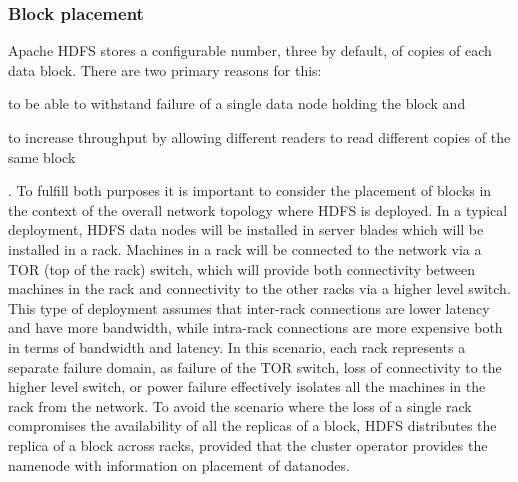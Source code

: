 \subsubsection{Block placement}
\label{sec:block-placement}
Apache HDFS stores a configurable number, three by default, of copies of each data block.
There are two primary reasons for this:
\begin{inparaenum}[i)]
\item to be able to withstand failure of a single data node holding the block and
\item to increase throughput by allowing different readers to read different copies of the same block
\end{inparaenum}.
To fulfill both purposes it is important to consider the placement of blocks in the context of the overall network topology where HDFS is deployed.
In a typical deployment, HDFS data nodes will be installed in server blades which will be installed in a rack.
Machines in a rack will be connected to the network via a TOR (top of the rack) switch, which will provide both connectivity between machines in the rack and connectivity to the other racks via a higher level switch.
This type of deployment assumes that inter-rack connections are lower latency and have more bandwidth, while intra-rack connections are more expensive both in terms of bandwidth and latency.
In this scenario, each rack represents a separate failure domain, as failure of the TOR switch, loss of connectivity to the higher level switch, or power failure effectively isolates all the machines in the rack from the network.
To avoid the scenario where the loss of a single rack compromises the availability of all the replicas of a block, HDFS distributes the replica of a block across racks, provided that the cluster operator provides the namenode with information on placement of datanodes.

